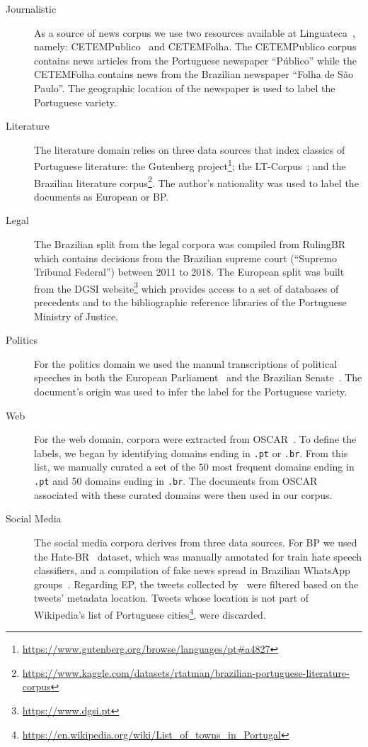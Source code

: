 \begin{description}

    \item[Journalistic] As a source of news corpus we use two resources available at Linguateca~\cite{santos2014corpora}, namely: CETEMPublico~\cite{rocha2000cetempublico} and CETEMFolha. The CETEMPublico corpus contains news articles from the Portuguese newspaper ``Público'' while the CETEMFolha contains news from the Brazilian newspaper ``Folha de São Paulo''. The geographic location of the newspaper is used to label the Portuguese variety.
    
    \item[Literature] The literature domain relies on three data sources that index classics of Portuguese literature: the Gutenberg project\footnote{\url{https://www.gutenberg.org/browse/languages/pt\#a4827}}; the LT-Corpus~\cite{genereux2012large}; and the Brazilian literature corpus\footnote{\url{https://www.kaggle.com/datasets/rtatman/brazilian-portuguese-literature-corpus}}. The author's nationality was used  to label the documents as European or BP.

    \item[Legal] The Brazilian split from the legal corpora was compiled from RulingBR~\cite{feijo2018rulingbr} which  contains decisions from the Brazilian supreme court (``Supremo Tribunal Federal'') between 2011 to 2018. The European split was built from the DGSI website\footnote{\url{https://www.dgsi.pt}} which provides access to a set of databases of precedents and to the bibliographic reference libraries of the Portuguese Ministry of Justice.

    \item[Politics] For the politics domain we used the manual transcriptions of political speeches in both the European Parliament~\cite{koehn2005europarl} and the Brazilian Senate~\cite{DVN/M9UU09_2020}. The document's origin was used to infer the label for the Portuguese variety.   

    \item[Web] For the web domain, corpora were extracted from OSCAR~\cite{OrtizSuarezSagotRomary2019}. To define the labels, we began by identifying domains ending in \texttt{.pt} or \texttt{.br}. From this list, we manually curated a set of the $50$ most frequent domains ending in \texttt{.pt} and 50 domains ending in \texttt{.br}. The documents from OSCAR associated with these curated domains were then used in our corpus.
    
    \item[Social Media] The social media corpora derives from three data sources. For BP we used the Hate-BR~\cite{vargas-etal-2022-hatebr} dataset, which was manually annotated for train hate speech classifiers, and a compilation of fake news spread in Brazilian WhatsApp groups~\cite{cunha2021fakewhatsapp}. Regarding EP, the tweets collected by~\citet{ramalho2021highlevel} were filtered based on the tweets' metadata location. Tweets whose location is not part of Wikipedia's list of Portuguese cities\footnote{\url{https://en.wikipedia.org/wiki/List_of_towns_in_Portugal}}, were discarded.
    
\end{description}

